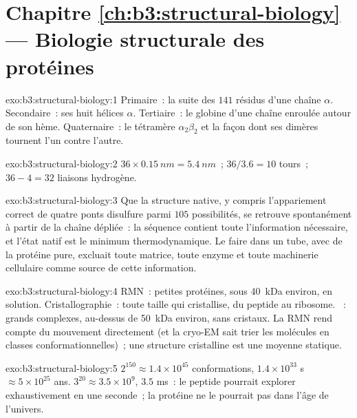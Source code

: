 \section*{Chapitre \ref{ch:b3:structural-biology} --- Biologie structurale des protéines}

\begin{solution}{exo:b3:structural-biology:1}
Primaire~: la suite des $141$ résidus d'une chaîne $\alpha$.
Secondaire~: ses huit hélices $\alpha$. Tertiaire~: le 
globine d'une chaîne enroulée autour de son hème. Quaternaire~: le
tétramère $\alpha_{2}\beta_{2}$ et la façon dont ses dimères tournent
l'un contre l'autre.
\end{solution}

\begin{solution}{exo:b3:structural-biology:2}
$36\times \qty{0.15}{nm} = \qty{5.4}{nm}$~; $36/3.6 = 10$ tours~;
$36 - 4 = 32$ liaisons hydrogène.
\end{solution}

\begin{solution}{exo:b3:structural-biology:3}
Que la structure native, y compris l'appariement correct de quatre
ponts disulfure parmi $105$ possibilités, se retrouve spontanément à
partir de la chaîne dépliée~: la séquence contient toute l'information
nécessaire, et l'état natif est le minimum thermodynamique. Le faire
dans un tube, avec de la protéine pure, excluait toute matrice, toute
enzyme et toute machinerie cellulaire comme source de cette
information.
\end{solution}

\begin{solution}{exo:b3:structural-biology:4}
RMN~: petites protéines, sous \qty{40}{kDa} environ, en solution.
Cristallographie~: toute taille qui cristallise, du peptide au
ribosome. ~: grands complexes, au-dessus
de \qty{50}{kDa} environ, sans cristaux. La RMN rend compte du
mouvement directement (et la cryo-EM sait trier les molécules en
classes conformationnelles)~; une structure cristalline est une moyenne
statique.
\end{solution}

\begin{solution}{exo:b3:structural-biology:5}
$2^{150} \approx 1.4\times 10^{45}$ conformations, $1.4\times 10^{33}$
s $\approx 5\times 10^{25}$ ans. $3^{20} \approx 3.5\times 10^{9}$,
$3.5$ ms~: le peptide pourrait explorer exhaustivement en une seconde~;
la protéine ne le pourrait pas dans l'âge de l'univers.
\end{solution}

